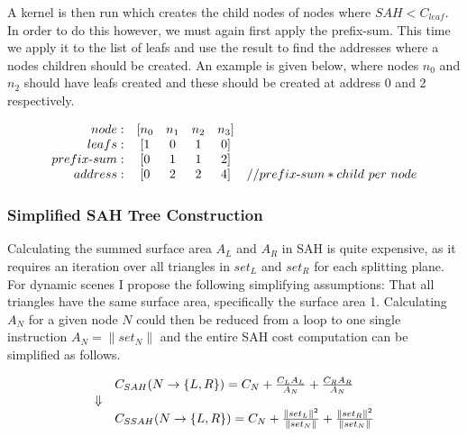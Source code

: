 
A kernel is then run which creates the child nodes of nodes where $SAH
< C_{leaf}$. In order to do this however, we must again first apply
the prefix-sum. This time we apply it to the list of leafs and use the
result to find the addresses where a nodes children should be
created. An example is given below, where nodes $n_0$ and $n_2$ should
have leafs created and these should be created at address 0 and 2
respectively.

\begin{displaymath}
  \begin{array}{r c c c c l}
    node: & [n_0 & n_1 & n_2 & n_3]\\
    leafs: & [1 & 0 & 1 & 0]\\
    prefix\text{-}sum: & [0 & 1 & 1 & 2]\\
    address: & [0 & 2 & 2 & 4] & // prefix\text{-}sum * child\text{ }per\text{ } node\\
  \end{array}
\end{displaymath}

\subsubsection{Simplified SAH Tree Construction}


Calculating the summed surface area $A_L$ and $A_R$ in SAH is quite
expensive, as it requires an iteration over all triangles in $set_L$
and $set_R$ for each splitting plane. For dynamic scenes I propose the
following simplifying assumptions: That all triangles have the same
surface area, specifically the surface area 1. Calculating $A_N$ for a
given node $N$ could then be reduced from a loop to one single
instruction $A_N = \|set_N\|$ and the entire SAH cost computation can
be simplified as follows.

\begin{displaymath}
  \begin{array}{r l}
    & C_{SAH}(N \rightarrow \{L, R\}) = C_N + \frac{C_L A_L}{A_N} + \frac{C_R
      A_R}{A_N}\\
    \Downarrow \\
    & C_{SSAH}(N \rightarrow \{L, R\}) = C_N +
    \frac{\|set_L\|^2}{\|set_N\|} + \frac{\|set_R\|^2}{\|set_N\|}\\
  \end{array}
\end{displaymath}

